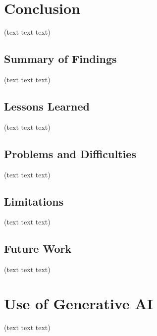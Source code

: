 \documentclass[10pt,a4paper,twocolumn]{article}
\begin{document}
\section{Conclusion}
(text text text)

\subsection{Summary of Findings}
(text text text)


\subsection{Lessons Learned}
(text text text)


\subsection{Problems and Difficulties}
(text text text)


\subsection{Limitations}
(text text text)


\subsection{Future Work}
(text text text)


\section{Use of Generative AI}
(text text text)
\end{document}
